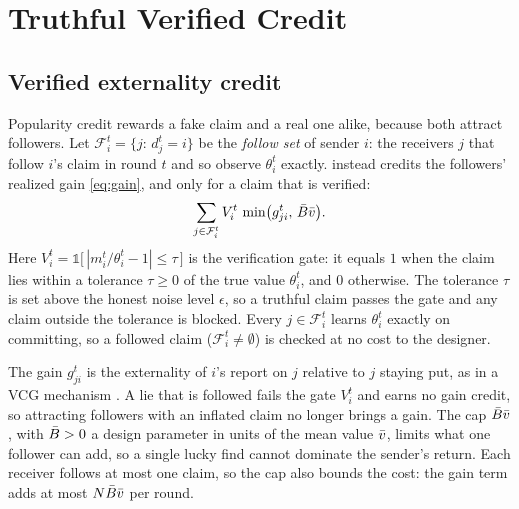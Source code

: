 \section{Truthful Verified Credit}
\label{sec:method}

\subsection{Verified externality credit}
\label{sec:ext}

Popularity credit rewards a fake claim and a real one alike, because both attract followers. Let $\mathcal F_i^t=\{j:\,d_j^t=i\}$ be the \emph{follow set} of sender $i$: the receivers $j$ that follow $i$'s claim in round $t$ and so observe $\theta_i^t$ exactly. \tvc{} instead credits the followers' realized gain \cref{eq:gain}, and only for a claim that is verified:
\begin{equation}
  \sum_{j\in\mathcal F_i^t} V_i^t\,\min\!\big(g_{ji}^t,\,\bar B\bar v\big).
  \label{eq:ext}
\end{equation}
Here $V_i^t=\mathbb{1}\big[\,|m_i^t/\theta_i^t-1|\le\tau\,\big]$ is the verification gate: it equals $1$ when the claim lies within a tolerance $\tau\ge0$ of the true value $\theta_i^t$, and $0$ otherwise. The tolerance $\tau$ is set above the honest noise level $\epsilon$, so a truthful claim passes the gate and any claim outside the tolerance is blocked. Every $j\in\mathcal F_i^t$ learns $\theta_i^t$ exactly on committing, so a followed claim ($\mathcal F_i^t\neq\emptyset$) is checked at no cost to the designer. 

The gain $g_{ji}^t$ is the externality of $i$'s report on $j$ relative to $j$ staying put, as in a VCG mechanism \citep{vickrey1961counterspeculation,clarke1971multipart,groves1973incentives}. A lie that is followed fails the gate $V_i^t$ and earns no gain credit, so attracting followers with an inflated claim no longer brings a gain. The cap $\bar B\bar v$, with $\bar B>0$ a design parameter in units of the mean value $\bar v$, limits what one follower can add, so a single lucky find cannot dominate the sender's return. Each receiver follows at most one claim, so the cap also bounds the cost: the gain term adds at most $N\bar B\bar v$ per round.

